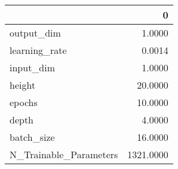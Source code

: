 \begin{tabular}{lr}
\toprule
{} &          0 \\
\midrule
output\_dim             &     1.0000 \\
learning\_rate          &     0.0014 \\
input\_dim              &     1.0000 \\
height                 &    20.0000 \\
epochs                 &    10.0000 \\
depth                  &     4.0000 \\
batch\_size             &    16.0000 \\
N\_Trainable\_Parameters &  1321.0000 \\
\bottomrule
\end{tabular}
